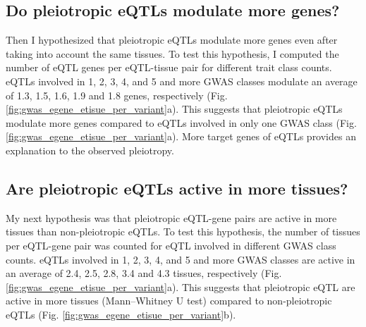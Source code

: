 \subsection*{Do pleiotropic eQTLs modulate more genes?}

Then I hypothesized that pleiotropic eQTLs modulate more genes even after taking into account the same tissues.
%
To test this hypothesis, I computed the number of eQTL genes per eQTL-tissue pair for different trait class counts.
%
%
eQTLs involved in 1, 2, 3, 4, and 5 and more GWAS classes modulate an average of 1.3, 1.5, 1.6, 1.9 and 1.8 genes, respectively (Fig. \ref{fig:gwas_egene_etisue_per_variant}a).
%
This suggests that pleiotropic eQTLs modulate more genes compared to eQTLs involved in only one GWAS class (Fig. \ref{fig:gwas_egene_etisue_per_variant}a).
%
More target genes of eQTLs provides an explanation to the observed pleiotropy.

\subsection*{Are pleiotropic eQTLs active in more tissues?}

My next hypothesis was that pleiotropic eQTL-gene pairs are active in more tissues than non-pleiotropic eQTLs.
%
To test this hypothesis, the number of tissues per eQTL-gene pair was counted for eQTL involved in different GWAS class counts.
%
eQTLs involved in 1, 2, 3, 4, and 5 and more GWAS classes are active in an average of 2.4, 2.5, 2.8, 3.4 and 4.3 tissues, respectively (Fig. \ref{fig:gwas_egene_etisue_per_variant}a).
%
This suggests that pleiotropic eQTL are active in more tissues (Mann–Whitney U test) compared to non-pleiotropic eQTLs (Fig. \ref{fig:gwas_egene_etisue_per_variant}b).

